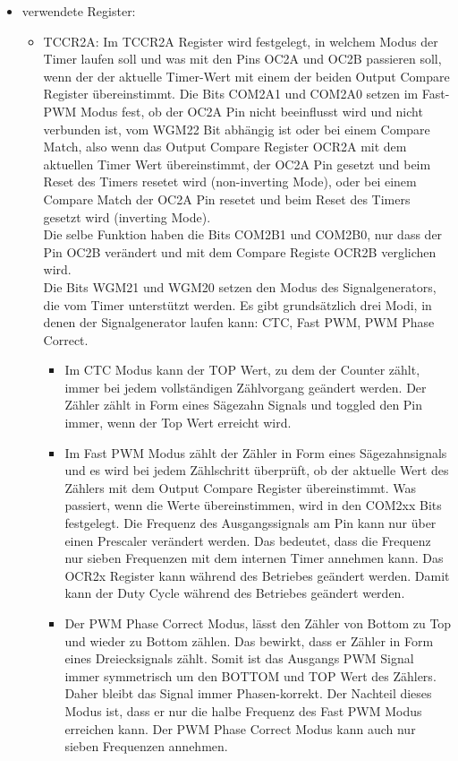 \begin{itemize}
\item verwendete Register:
\begin{itemize}
\item TCCR2A: Im TCCR2A Register wird festgelegt, in welchem Modus der Timer laufen soll und was mit den Pins OC2A und OC2B passieren soll, wenn der der aktuelle Timer-Wert mit einem der beiden Output Compare Register übereinstimmt. Die Bits COM2A1 und COM2A0 setzen im Fast-PWM Modus fest, ob der OC2A Pin nicht beeinflusst wird und nicht verbunden ist, vom WGM22 Bit abhängig ist oder bei einem Compare Match, also wenn das Output Compare Register OCR2A mit dem aktuellen Timer Wert übereinstimmt, der OC2A Pin gesetzt und beim Reset des Timers resetet wird (non-inverting Mode), oder bei einem Compare Match der OC2A Pin resetet und beim Reset des Timers gesetzt wird (inverting Mode). \\ Die selbe Funktion haben die Bits COM2B1 und COM2B0, nur dass der Pin OC2B verändert und mit dem Compare Registe OCR2B verglichen wird. \\
Die Bits WGM21 und WGM20 setzen den Modus des Signalgenerators, die vom Timer unterstützt werden. Es gibt grundsätzlich drei Modi, in denen der Signalgenerator laufen kann: CTC, Fast PWM, PWM Phase Correct. \\
\begin{itemize}
\item Im CTC Modus kann der TOP Wert, zu dem der Counter zählt, immer bei jedem vollständigen Zählvorgang geändert werden. Der Zähler zählt in Form eines Sägezahn Signals und toggled den Pin immer, wenn der Top Wert erreicht wird.\\
\item Im Fast PWM Modus zählt der Zähler in Form eines Sägezahnsignals und es wird bei jedem Zählschritt überprüft, ob der aktuelle Wert des Zählers mit dem Output Compare Register übereinstimmt. Was passiert, wenn die Werte übereinstimmen, wird in den COM2xx Bits festgelegt. Die Frequenz des Ausgangssignals am Pin kann nur über einen Prescaler verändert werden. Das bedeutet, dass die Frequenz nur sieben Frequenzen mit dem internen Timer annehmen kann. Das OCR2x Register kann während des Betriebes geändert werden. Damit kann der Duty Cycle während des Betriebes geändert werden. \\
\item Der PWM Phase Correct Modus, lässt den Zähler von Bottom zu Top und wieder zu Bottom zählen. Das bewirkt, dass er Zähler in Form eines Dreiecksignals zählt. Somit ist das Ausgangs PWM Signal immer symmetrisch um den BOTTOM und TOP Wert des Zählers. Daher bleibt das Signal immer Phasen-korrekt. Der Nachteil dieses Modus ist, dass er nur die halbe Frequenz des Fast PWM Modus erreichen kann. Der PWM Phase Correct Modus kann auch nur sieben Frequenzen annehmen.\\

\end{itemize}
\end{itemize}
\end{itemize}
